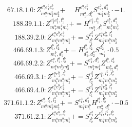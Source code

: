 \documentclass[letterpaper,10pt,fleqn,leqno,onecolumn]{article}
\begin{document}
\begin{equation} \;\;\;\;\;\;  67.18.1.0: Z^{e_{1}^{a}e_{1}^{b}e_{2}^{b}}_{m_{1}^{a}m_{1}^{b}m_{2}^{b}}+=H^{e_{1}^{a}e_{1}^{b}}_{m_{1}^{a},d_{1}^{b}}S^{e_{2}^{b},d_{1}^{b}}_{m_{1}^{b}m_{2}^{b}}\cdot -1. \end{equation}
\begin{equation} \;\;\;\;\;\;  188.39.1.1: Z^{e_{1}^{a}e_{1}^{b},l_{1}^{b}}_{m_{1}^{a}m_{1}^{b}m_{2}^{b}}+=H^{e_{1}^{a},l_{1}^{b}}_{m_{1}^{a},d_{1}^{b}}S^{e_{1}^{b},d_{1}^{b}}_{m_{1}^{b}m_{2}^{b}} \end{equation}
\begin{equation} \;\;\;\;\;\;  188.39.2.0: Z^{e_{1}^{a}e_{1}^{b}e_{2}^{b}}_{m_{1}^{a}m_{1}^{b}m_{2}^{b}}+=S^{e_{1}^{b}}_{l_{1}^{b}}Z^{e_{1}^{a}e_{2}^{b},l_{1}^{b}}_{m_{1}^{a}m_{1}^{b}m_{2}^{b}} \end{equation}
\begin{equation} \;\;\;\;\;\;  466.69.1.3: Z^{l_{1}^{b},l_{2}^{b}}_{m_{1}^{b},d_{1}^{b}}+=H^{l_{1}^{b},l_{2}^{b}}_{d_{1}^{b},d_{2}^{b}}S^{d_{2}^{b}}_{m_{1}^{b}}\cdot 0.5 \end{equation}
\begin{equation} \;\;\;\;\;\;  466.69.2.2: Z^{e_{1}^{a},l_{1}^{b},l_{2}^{b}}_{m_{1}^{a}m_{1}^{b}m_{2}^{b}}+=S^{e_{1}^{a},d_{1}^{b}}_{m_{1}^{a}m_{1}^{b}}Z^{l_{1}^{b},l_{2}^{b}}_{m_{2}^{b},d_{1}^{b}} \end{equation}
\begin{equation} \;\;\;\;\;\;  466.69.3.1: Z^{e_{1}^{a}e_{1}^{b},l_{1}^{b}}_{m_{1}^{a}m_{1}^{b}m_{2}^{b}}+=S^{e_{1}^{b}}_{l_{2}^{b}}Z^{e_{1}^{a},l_{1}^{b},l_{2}^{b}}_{m_{1}^{a}m_{1}^{b}m_{2}^{b}} \end{equation}
\begin{equation} \;\;\;\;\;\;  466.69.4.0: Z^{e_{1}^{a}e_{1}^{b}e_{2}^{b}}_{m_{1}^{a}m_{1}^{b}m_{2}^{b}}+=S^{e_{1}^{b}}_{l_{1}^{b}}Z^{e_{1}^{a}e_{2}^{b},l_{1}^{b}}_{m_{1}^{a}m_{1}^{b}m_{2}^{b}} \end{equation}
\begin{equation} \;\;\;\;\;\;  371.61.1.2: Z^{e_{1}^{a},l_{1}^{b},l_{2}^{b}}_{m_{1}^{a}m_{1}^{b}m_{2}^{b}}+=S^{e_{1}^{a},d_{1}^{b}}_{m_{1}^{a}m_{1}^{b}}H^{l_{1}^{b},l_{2}^{b}}_{m_{2}^{b},d_{1}^{b}}\cdot -0.5 \end{equation}
\begin{equation} \;\;\;\;\;\;  371.61.2.1: Z^{e_{1}^{a}e_{1}^{b},l_{1}^{b}}_{m_{1}^{a}m_{1}^{b}m_{2}^{b}}+=S^{e_{1}^{b}}_{l_{2}^{b}}Z^{e_{1}^{a},l_{1}^{b},l_{2}^{b}}_{m_{1}^{a}m_{1}^{b}m_{2}^{b}} \end{equation}
\end{document}
